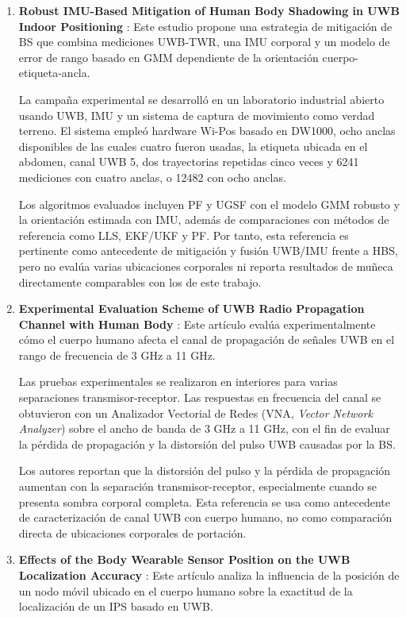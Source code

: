\begin{enumerate}
    \item \textbf{Robust IMU-Based Mitigation of Human Body Shadowing in UWB Indoor Positioning} \cite{Tanghe2023}: Este estudio propone una estrategia de mitigación de BS que combina mediciones UWB-TWR, una IMU corporal y un modelo de error de rango basado en GMM dependiente de la orientación cuerpo-etiqueta-ancla.
    
    La campaña experimental se desarrolló en un laboratorio industrial abierto usando UWB, IMU y un sistema de captura de movimiento como verdad terreno. El sistema empleó hardware Wi-Pos basado en DW1000, ocho anclas disponibles de las cuales cuatro fueron usadas, la etiqueta ubicada en el abdomen, canal UWB 5, dos trayectorias repetidas cinco veces y 6241 mediciones con cuatro anclas, o 12482 con ocho anclas.

    Los algoritmos evaluados incluyen PF y UGSF con el modelo GMM robusto y la orientación estimada con IMU, además de comparaciones con métodos de referencia como LLS, EKF/UKF y PF. Por tanto, esta referencia es pertinente como antecedente de mitigación y fusión UWB/IMU frente a HBS, pero no evalúa varias ubicaciones corporales ni reporta resultados de muñeca directamente comparables con los de este trabajo.

    \item \textbf{Experimental Evaluation Scheme of UWB Radio Propagation Channel with Human Body} \cite{Pradabphon2019}: Este artículo evalúa experimentalmente cómo el cuerpo humano afecta el canal de propagación de señales UWB en el rango de frecuencia de 3 GHz a 11 GHz. 
    
    Las pruebas experimentales se realizaron en interiores para varias separaciones transmisor-receptor. Las respuestas en frecuencia del canal se obtuvieron con un Analizador Vectorial de Redes (VNA, \textit{Vector Network Analyzer}) sobre el ancho de banda de 3 GHz a 11 GHz, con el fin de evaluar la pérdida de propagación y la distorsión del pulso UWB causadas por la BS.
    
    Los autores reportan que la distorsión del pulso y la pérdida de propagación aumentan con la separación transmisor-receptor, especialmente cuando se presenta sombra corporal completa. Esta referencia se usa como antecedente de caracterización de canal UWB con cuerpo humano, no como comparación directa de ubicaciones corporales de portación.

    \item \textbf{Effects of the Body Wearable Sensor Position on the UWB Localization Accuracy} \cite{ref4}: Este artículo analiza la influencia de la posición de un nodo móvil ubicado en el cuerpo humano sobre la exactitud de la localización de un IPS basado en UWB. 
    

\end{enumerate}
